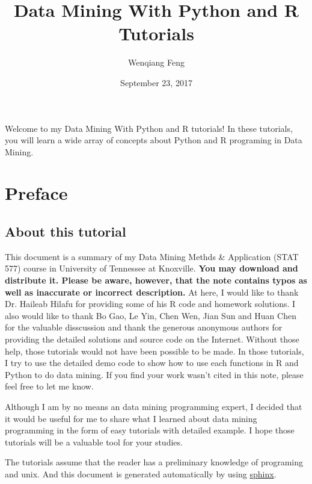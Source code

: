 \documentclass[letterpaper,11pt,english]{sphinxmanual}
\title{Data Mining With Python and R Tutorials}
\date{September 23, 2017}
\author{Wenqiang Feng}
\begin{document}
\maketitle
\tableofcontents
{}\label{index::doc}\label{index:index}
Welcome to my Data Mining With Python and R tutorials! In these tutorials, you will learn a wide array
of concepts about Python and R programing in Data Mining.




\chapter{Preface}
\label{preface:id1}\label{preface::doc}\label{preface:contents}\label{preface:preface}

\section{About this tutorial}
\label{preface:about-this-tutorial}
This document is a summary of my Data Mining Methds \& Application (STAT 577) course in University of Tennessee at Knoxville.  \textbf{You may
download and distribute it. Please be aware, however, that the note contains typos as well as inaccurate or
incorrect description.} At here, I would like to thank Dr. Haileab Hilafu for providing some of his R code and
homework solutions. I also would like to thank Bo Gao, Le Yin, Chen Wen, Jian Sun and Huan Chen for the valuable disscussion
and thank the generous anonymous authors for providing the detailed solutions and source code on the Internet.
Without those help, those tutorials would not have been possible to be made. In those tutorials, I try to use the
detailed demo code to show how to use each functions in R and Python to do data mining. If you find your work wasn't cited in
this note, please feel free to let me know.

Although I am by no means an data mining programming expert, I decided that it would be useful for me to share what I learned
about data mining programming in the form of easy tutorials with detailed example. I hope those tutorials will be a valuable tool for your studies.

The tutorials assume that the reader has a preliminary knowledge of programing and unix. And this document is generated automatically by using \href{http://sphinx.pocoo.org}{sphinx}.
\end{document}
